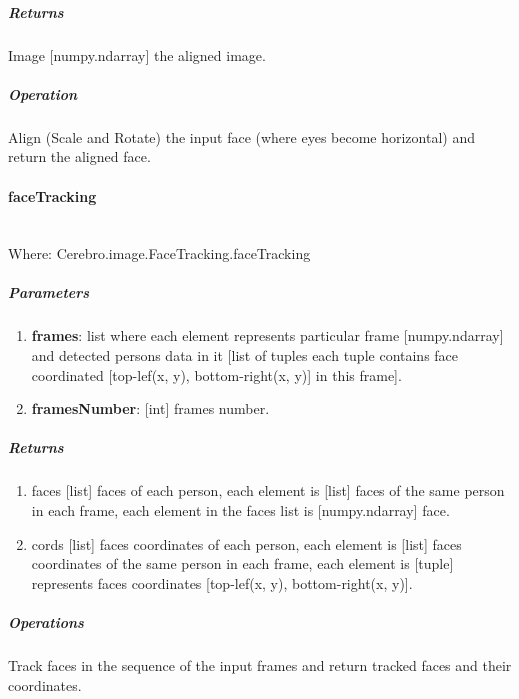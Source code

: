 \subparagraph{Returns}
\begin{changemargin}{1cm}{0cm}
	Image [numpy.ndarray] the aligned image.
\end{changemargin}

\subparagraph{Operation}
\begin{changemargin}{1cm}{0cm}
	Align (Scale and Rotate) the input face (where eyes become horizontal) and return the aligned face.
\end{changemargin}


\paragraph{faceTracking} \mbox{} \\
Where: Cerebro.image.FaceTracking.faceTracking
\subparagraph{Parameters}
\begin{changemargin}{0.5cm}{0cm}
	\begin{enumerate}
		\item \textbf{frames}: list where each element represents particular frame [numpy.ndarray] and detected persons data in it [list of tuples each tuple contains face coordinated [top-lef(x, y), bottom-right(x, y)] in this frame].
		\item \textbf{framesNumber}: [int] frames number.
	\end{enumerate}
\end{changemargin}

\subparagraph{Returns}
\begin{changemargin}{1cm}{0cm}
	\begin{enumerate} 
		\item faces [list] faces of each person, each element is [list] faces of the same person in each frame, each element in the faces list is [numpy.ndarray] face.
		\item cords [list] faces coordinates of each person, each element is [list] faces coordinates of the same person in each frame, each element is [tuple] represents faces coordinates [top-lef(x, y), bottom-right(x, y)].
	\end{enumerate}
\end{changemargin}

\subparagraph{Operations}
\begin{changemargin}{1cm}{0cm}
	Track faces in the sequence of the input frames and return tracked faces and their coordinates.
\end{changemargin}